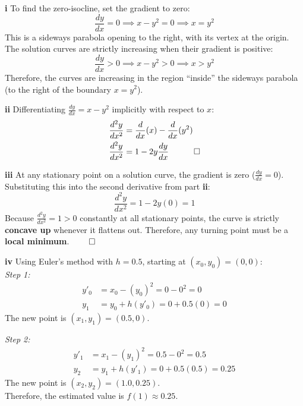 \begin{solution}
\textbf{i} To find the zero-isocline, set the gradient to zero:
\[ \frac{dy}{dx} = 0 \implies x - y^2 = 0 \implies x = y^2 \]
This is a sideways parabola opening to the right, with its vertex at the origin. \\
The solution curves are strictly increasing when their gradient is positive:
\[ \frac{dy}{dx} > 0 \implies x - y^2 > 0 \implies x > y^2 \]
Therefore, the curves are increasing in the region ``inside'' the sideways parabola (to the right of the boundary $x=y^2$).

\vspace{0.3cm}
\textbf{ii} Differentiating $\frac{dy}{dx} = x - y^2$ implicitly with respect to $x$:
\begin{align*}
    \frac{d^2y}{dx^2} &= \frac{d}{dx}(x) - \frac{d}{dx}(y^2) \\
    \frac{d^2y}{dx^2} &= 1 - 2y \frac{dy}{dx} \quad \qed
\end{align*}

\vspace{0.3cm}
\textbf{iii} At any stationary point on a solution curve, the gradient is zero ($\frac{dy}{dx} = 0$). \\
Substituting this into the second derivative from part \textbf{ii}:
\[ \frac{d^2y}{dx^2} = 1 - 2y(0) = 1 \]
Because $\frac{d^2y}{dx^2} = 1 > 0$ constantly at all stationary points, the curve is strictly \textbf{concave up} whenever it flattens out. Therefore, any turning point must be a \textbf{local minimum}. $\qed$

\vspace{0.3cm}
\textbf{iv} Using Euler's method with $h = 0.5$, starting at $(x_0, y_0) = (0,0)$: \\
\textit{Step 1:}
\begin{align*}
    y'_0 &= x_0 - (y_0)^2 = 0 - 0^2 = 0 \\
    y_1 &= y_0 + h(y'_0) = 0 + 0.5(0) = 0
\end{align*}
The new point is $(x_1, y_1) = (0.5, 0)$.

\textit{Step 2:}
\begin{align*}
    y'_1 &= x_1 - (y_1)^2 = 0.5 - 0^2 = 0.5 \\
    y_2 &= y_1 + h(y'_1) = 0 + 0.5(0.5) = 0.25
\end{align*}
The new point is $(x_2, y_2) = (1.0, 0.25)$. \\
Therefore, the estimated value is \textbf{$f(1) \approx 0.25$}.
\end{solution}


